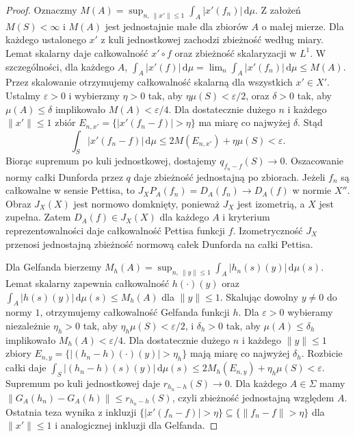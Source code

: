 \begin{proof}
Oznaczmy
$M(A)=\sup_{n,\ \|x'\|\le1}\int_A|x'(f_n)|\,\mathrm d\mu$.
Z założeń $M(S)<\infty$ i $M(A)$ jest jednostajnie małe
dla zbiorów $A$ o małej mierze. Dla każdego ustalonego $x'$
z kuli jednostkowej zachodzi zbieżność według miary.
Lemat skalarny daje całkowalność $x'\circ f$ oraz zbieżność
skalaryzacji w $L^1$. W szczególności, dla każdego $A$,
$\int_A|x'(f)|\,\mathrm d\mu
=\lim_n\int_A|x'(f_n)|\,\mathrm d\mu\le M(A)$.
Przez skalowanie otrzymujemy całkowalność skalarną
dla wszystkich $x'\in X'$.
Ustalmy $\varepsilon>0$ i wybierzmy $\eta>0$ tak,
aby $\eta\mu(S)<\varepsilon/2$, oraz $\delta>0$
tak, aby $\mu(A)\le\delta$ implikowało $M(A)<\varepsilon/4$.
Dla dostatecznie dużego $n$ i każdego $\|x'\|\le1$ zbiór
$E_{n,x'}=\{|x'(f_n-f)|>\eta\}$ ma miarę co najwyżej $\delta$.
Stąd
\[
 \int_S|x'(f_n-f)|\,\mathrm d\mu
 \le 2M(E_{n,x'})+\eta\mu(S)<\varepsilon.
\]
Biorąc supremum po kuli jednostkowej, dostajemy
$q_{f_n-f}(S)\to0$. Oszacowanie normy całki Dunforda
przez $q$ daje zbieżność jednostajną po zbiorach.
Jeżeli $f_n$ są całkowalne w sensie Pettisa, to
$J_X P_A(f_n)=D_A(f_n)\to D_A(f)$ w normie $X''$.
Obraz $J_X(X)$ jest normowo domknięty, ponieważ
$J_X$ jest izometrią, a $X$ jest zupełna.
Zatem $D_A(f)\in J_X(X)$ dla każdego $A$ i kryterium
reprezentowalności daje całkowalność Pettisa funkcji $f$.
Izometryczność $J_X$ przenosi jednostajną zbieżność
normową całek Dunforda na całki Pettisa.

Dla Gelfanda bierzemy
$M_h(A)=\sup_{n,\ \|y\|\le1}\int_A|h_n(s)(y)|\,\mathrm d\mu(s)$.
Lemat skalarny zapewnia całkowalność $h(\cdot)(y)$
oraz $\int_A|h(s)(y)|\,\mathrm d\mu(s)\le M_h(A)$
dla $\|y\|\le1$. Skalując dowolny $y\ne0$ do normy $1$,
otrzymujemy całkowalność Gelfanda funkcji $h$.
Dla $\varepsilon>0$ wybieramy niezależnie $\eta_h>0$
tak, aby $\eta_h\mu(S)<\varepsilon/2$, i $\delta_h>0$
tak, aby $\mu(A)\le\delta_h$ implikowało
$M_h(A)<\varepsilon/4$. Dla dostatecznie dużego $n$
i każdego $\|y\|\le1$ zbiory
$E_{n,y}=\{|(h_n-h)(\cdot)(y)|>\eta_h\}$ mają miarę
co najwyżej $\delta_h$. Rozbicie całki daje
$\int_S|(h_n-h)(s)(y)|\,\mathrm d\mu(s)
\le2M_h(E_{n,y})+\eta_h\mu(S)<\varepsilon$.
Supremum po kuli jednostkowej daje $r_{h_n-h}(S)\to0$.
Dla każdego $A\in\Sigma$ mamy
$\|G_A(h_n)-G_A(h)\|\le r_{h_n-h}(S)$,
czyli zbieżność jednostajną względem $A$.
Ostatnia teza wynika z inkluzji
$\{|x'(f_n-f)|>\eta\}\subseteq\{\|f_n-f\|>\eta\}$
dla $\|x'\|\le1$ i analogicznej inkluzji dla Gelfanda.
\end{proof}

